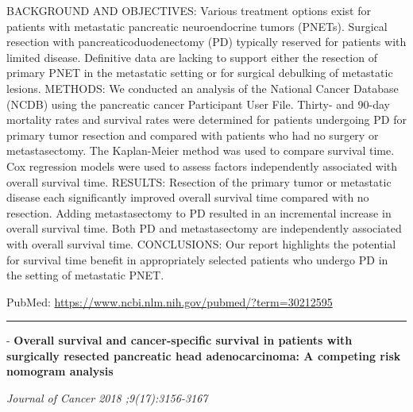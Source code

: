\documentclass[]{article}
\begin{document}
BACKGROUND AND OBJECTIVES: Various treatment options exist for patients
with metastatic pancreatic neuroendocrine tumors (PNETs). Surgical
resection with pancreaticoduodenectomy (PD) typically reserved for
patients with limited disease. Definitive data are lacking to support
either the resection of primary PNET in the metastatic setting or for
surgical debulking of metastatic lesions. METHODS: We conducted an
analysis of the National Cancer Database (NCDB) using the pancreatic
cancer Participant User File. Thirty- and 90-day mortality rates and
survival rates were determined for patients undergoing PD for primary
tumor resection and compared with patients who had no surgery or
metastasectomy. The Kaplan-Meier method was used to compare survival
time. Cox regression models were used to assess factors independently
associated with overall survival time. RESULTS: Resection of the primary
tumor or metastatic disease each significantly improved overall survival
time compared with no resection. Adding metastasectomy to PD resulted in
an incremental increase in overall survival time. Both PD and
metastasectomy are independently associated with overall survival time.
CONCLUSIONS: Our report highlights the potential for survival time
benefit in appropriately selected patients who undergo PD in the setting
of metastatic PNET.

PubMed: \url{https://www.ncbi.nlm.nih.gov/pubmed/?term=30212595}

{}

{}

\begin{center}\rule{0.5\linewidth}{\linethickness}\end{center}

 - \textbf{Overall survival and cancer-specific survival in patients
with surgically resected pancreatic head adenocarcinoma: A competing
risk nomogram analysis}

\emph{Journal of Cancer 2018 ;9(17):3156-3167}
\end{document}
